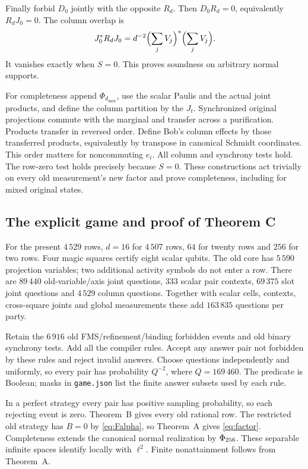 Finally forbid $D_0$ jointly with the opposite $R_d$. Then $D_0R_d=0$, equivalently $R_dJ_0=0$. The column overlap is
\[
 J_0^*R_dJ_0=d^{-2}\Bigl(\sum_jV_j\Bigr)^*
                                  \Bigl(\sum_jV_j\Bigr).
\]
It vanishes exactly when $S=0$. This proves soundness on arbitrary normal supports.

For completeness append $\Phi_{d_{\max}}$, use the scalar Paulis and the actual joint products, and define the column partition by the $J_t$. Synchronized original projections commute with the marginal and transfer across a purification. Products transfer in reversed order. Define Bob's column effects by those transferred products, equivalently by transpose in canonical Schmidt coordinates. This order matters for noncommuting $e_i$. All column and synchrony tests hold. The row-zero test holds precisely because $S=0$. These constructions act trivially on every old measurement's new factor and prove completeness, including for mixed original states.

\subsection{The explicit game and proof of Theorem C}
For the present $4\,529$ rows, $d=16$ for $4\,507$ rows, $64$ for twenty rows and $256$ for two rows. Four magic squares certify eight scalar qubits. The old core has $5\,590$ projection variables; two additional activity symbols do not enter a row. There are $89\,440$ old-variable/axis joint questions, $333$ scalar pair contexts, $69\,375$ slot joint questions and $4\,529$ column questions. Together with scalar cells, contexts, cross-square joints and global measurements these add $163\,835$ questions per party.

Retain the $6\,916$ old FMS/refinement/binding forbidden events and old binary synchrony tests. Add all the compiler rules. Accept any answer pair not forbidden by these rules and reject invalid answers. Choose questions independently and uniformly, so every pair has probability $Q^{-2}$, where $Q=169\,460$. The predicate is Boolean; masks in \texttt{game.json} list the finite answer subsets used by each rule.

In a perfect strategy every pair has positive sampling probability, so each rejecting event is zero. Theorem~B gives every old rational row. The restricted old strategy has $B=0$ by \eqref{eq:Falpha}, so Theorem~A gives \eqref{eq:factor}. Completeness extends the canonical normal realization by $\Phi_{256}$. These separable infinite spaces identify locally with $\ell^2$. Finite nonattainment follows from Theorem~A.

